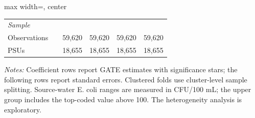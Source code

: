 \begin{landscape}
\begin{table}[p]
\begin{adjustbox}{max width=\linewidth, center}
\begin{tabular}{llcccc}
\multicolumn{6}{l}{\textit{Sample}} \\
\quad Observations &  & 59,620 & 59,620 & 59,620 & 59,620 \\
\quad PSUs &  & 18,655 & 18,655 & 18,655 & 18,655 \\
\bottomrule
\end{tabular}
\end{adjustbox}
\par\vspace{3pt}
\begin{minipage}{\linewidth}\footnotesize \textit{Notes:} Coefficient rows report GATE estimates with significance stars; the following rows report standard errors. Clustered folds use cluster-level sample splitting. Source-water E. coli ranges are measured in CFU/100 mL; the upper group includes the top-coded value above 100. The heterogeneity analysis is exploratory.\end{minipage}
\end{table}
\end{landscape}